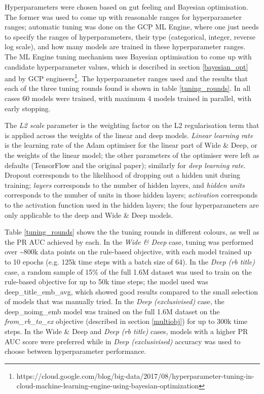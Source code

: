 Hyperparameters were chosen based on gut feeling and Bayesian optimisation.
The former was used to come up with reasonable ranges for hyperparameter ranges; automatic tuning was done on the GCP ML Engine, where one just needs to specify the ranges of hyperparameters, their type (categorical, integer, reverse log scale), and how many models are trained in these hyperparameter ranges.
The ML Engine tuning mechanism uses Bayesian optimisation to come up with candidate hyperparameter values, which is described in section \ref{bayesian_opt} and by GCP engineers\footnote{https://cloud.google.com/blog/big-data/2017/08/hyperparameter-tuning-in-cloud-machine-learning-engine-using-bayesian-optimization}.
The hyperparameter ranges used and the results that each of the three tuning rounds found is shown in table \ref{tuning_rounds}.
In all cases 60 models were trained, with maximum 4 models trained in parallel, with early stopping.

The \textit{L2 scale} parameter is the weighting factor on the L2 regularisation term that is applied across the weights of the linear and deep models.
\textit{Linear learning rate} is the learning rate of the Adam optimiser for the linear part of Wide \& Deep, or the weights of the linear model; the other parameters of the optimiser were left as defaults (TensorFlow and the original paper); similarly for \textit{deep learning rate}.
Dropout corresponds to the likelihood of dropping out a hidden unit during training; \textit{layers} corresponds to the number of hidden layers, and \textit{hidden units} corresponds to the number of units in those hidden layers; \textit{activation} corresponds to the activation function used in the hidden layers; the four hyperparameters are only applicable to the deep and Wide \& Deep models.

Table \ref{tuning_rounds} shows the the tuning rounds in different colours, as well as the PR AUC achieved by each.
In the \textit{Wide \& Deep} case, tuning was performed over \textasciitilde800k data points on the rule-based objective, with each model trained up to 10 epochs (e.g. 125k time steps with a batch size of 64).
In the \textit{Deep (rb title)} case, a random sample of 15\% of the full 1.6M dataset was used to train on the rule-based objective for up to 50k time steps; the model used was deep\_title\_emb\_avg, which showed good results compared to the small selection of models that was manually tried.
In the \textit{Deep (exclusivised)} case, the deep\_noimg\_emb model was trained on the full 1.6M dataset on the \textit{from\_rb\_to\_ex} objective (described in section \ref{multiobj}) for up to 300k time steps.
In the {Wide \& Deep} and \textit{Deep (rb title)} cases, models with a higher PR AUC score were preferred while in \textit{Deep (exclusivised)} accuracy was used to choose between hyperparameter performance.

